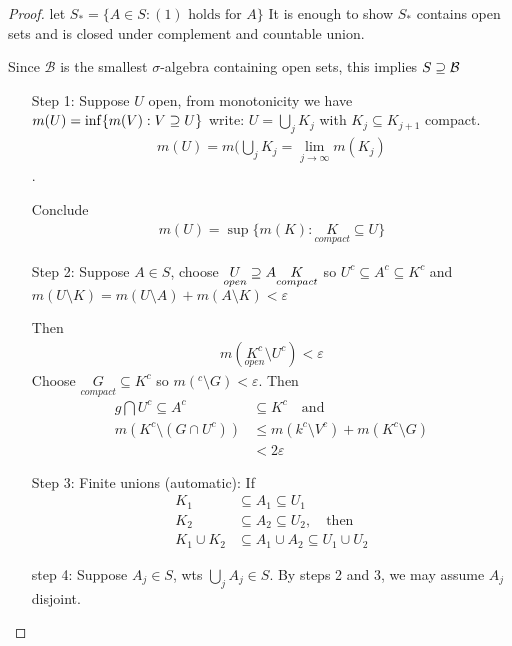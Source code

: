 \begin{proof}
	let $S_{*} = \{A \in S: (1) \text{ holds for $A$} \}$
It is enough to show $S_{*}$ contains open sets and is closed under complement and countable union.

Since $\mathcal{B}$ is the smallest $\sigma$-algebra containing open sets, this implies $S \supseteq \mathcal{B}$

\begin{enumerate}
	\item[Step 1:] Suppose $U$ open, from monotonicity we have $m(U) = \inf\{m(V) : V \supseteq U \}$
		write: $U = \bigcup_j K_j$ with  $K_j \subseteq K_{j+1}$ compact.
		\begin{align*}
			m(U) = m(\bigcup_j K_j = \lim_{j \to \infty} m(K_j)
		\end{align*} .

		Conclude
		\begin{align*}
			m(U) = \sup\{m(K) : \underset{compact}{K} \subseteq U \}
		\end{align*}

	\item[Step 2:] Suppose $A \in S$, choose $\underset{open}{U} \supseteq A \underset{compact}{K}$
		so $U^{c} \subseteq A^{c} \subseteq K^{c}$ and $m(U \setminus K) = m(U \setminus A) +m (A \setminus K) < \varepsilon$

		Then
		\begin{align*}
			m(\underset{open}{K^{c}} \setminus \underset{}{U^{c}}) < \varepsilon
		\end{align*}
		Choose $\underset{compact}{G} \subseteq K^{c}$ so $m(^{c} \setminus G) < \varepsilon$. Then
	\begin{align*}
		g \bigcap U^{c} \subseteq A^{c} &\subseteq K^{c} \quad \text{and} \\
	m(K^{c} \setminus (G \cap U^{c})) &\leq m(k^{c} \setminus V^{c}) + m(K^{c} \setminus G) \\
									 &< 2\varepsilon
	\end{align*}
\item[Step 3:]
	Finite unions (automatic):
	If \begin{align*}
		K_1 &\subseteq A_1 \subseteq U_1 \\
		K_2 &\subseteq A_2 \subseteq U_2, \quad \text{then} \\
		K_1 \cup K_2 &\subseteq A_1 \cup A_2 \subseteq U_1 \cup U_2
	\end{align*}
\item[step 4:]
	Suppose $A_j \in S$, wts $\bigcup_j A_j \in S$. By steps 2 and 3, we may assume  $A_j$ disjoint.


\end{enumerate}
\end{proof}
